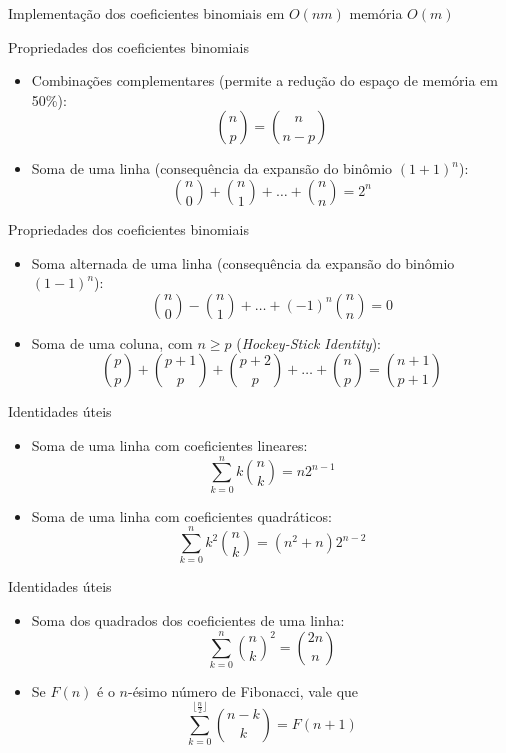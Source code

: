 \begin{frame}[fragile]{Implementação dos coeficientes binomiais em $O(nm)$ memória $O(m)$}
\end{frame}

\begin{frame}[fragile]{Propriedades dos coeficientes binomiais}

    \begin{itemize}
        \item Combinações complementares (permite a redução do espaço de memória em 50\%):
$$
    \binom{n}{p} = \binom{n}{n - p}
$$

        \item  Soma de uma linha (consequência da expansão do binômio $(1 + 1)^n$):
$$
    \binom{n}{0} + \binom{n}{1} + \ldots + \binom{n}{n} = 2^n
$$
    \end{itemize}

\end{frame}

\begin{frame}[fragile]{Propriedades dos coeficientes binomiais}

    \begin{itemize}
        \item Soma alternada de uma linha (consequência da expansão do binômio $(1 - 1)^n$):
$$
    \binom{n}{0} - \binom{n}{1} + \ldots + (-1)^n\binom{n}{n} = 0
$$

        \item Soma de uma coluna, com $n\geq p$ (\textit{Hockey-Stick Identity}):
$$
    \binom{p}{p} + \binom{p + 1}{p} + \binom{p + 2}{p} + \ldots + \binom{n}{p} = \binom{n + 1}{p + 1}
$$
    \end{itemize}

\end{frame}

\begin{frame}[fragile]{Identidades úteis}

    \begin{itemize}
        \item Soma de uma linha com coeficientes lineares:
$$
    \sum_{k = 0}^n k\binom{n}{k} = n2^{n - 1}
$$

        \item Soma de uma linha com coeficientes quadráticos:
$$
    \sum_{k = 0}^n k^2\binom{n}{k} = (n^2 + n)2^{n - 2}
$$
    \end{itemize}

\end{frame}

\begin{frame}[fragile]{Identidades úteis}

    \begin{itemize}
        \item Soma dos quadrados dos coeficientes de uma linha:
$$
    \sum_{k = 0}^n \binom{n}{k}^2 = \binom{2n}{n}
$$

        \item Se $F(n)$ é o $n$-ésimo número de Fibonacci, vale que
$$
    \sum_{k = 0}^{\lfloor \frac{n}{2}\rfloor} \binom{n - k}{k} = F(n + 1)
$$
    \end{itemize}

\end{frame}
